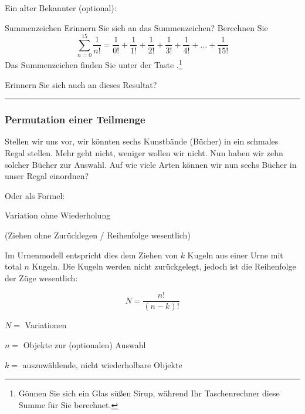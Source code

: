 \newpage
Ein alter Bekannter (optional):

\vspace{3mm}

\begin{bemerkung}{Summenzeichen}{}
Erinnern Sie sich an das Summenzeichen? Berechnen
Sie $$\sum_{n=0}^{15}\frac{1}{n!} = \frac{1}{0!} + \frac{1}{1!}
+ \frac1{2!} + \frac1{3!} + \frac1{4!} + ... + \frac1{15!}$$ Das Summenzeichen finden Sie unter
der Taste .\footnote{Gönnen Sie sich
ein Glas süßen Sirup, während Ihr Taschenrechner diese Summe für Sie berechnet.}
\end{bemerkung}

Erinnern Sie sich auch an dieses Resultat? 

\vspace{1mm}

\hrule


\newpage


\subsubsection{Permutation einer Teilmenge}\label{kombiVariationEinerTeilmenge}
Stellen wir uns vor, wir könnten sechs Kunstbände (Bücher) in ein schmales
Regal stellen. Mehr geht nicht, weniger wollen wir nicht.
Nun haben wir zehn solcher Bücher zur Auswahl. Auf wie viele Arten können wir nun sechs Bücher in unser Regal einordnen?


Oder als Formel:
\begin{gesetz}{Variation ohne Wiederholung}{}

  (Ziehen ohne Zurücklegen / Reihenfolge wesentlich)


Im Urnenmodell entspricht dies dem Ziehen von $k$ Kugeln aus einer
Urne mit total $n$ Kugeln. Die Kugeln werden nicht zurückgelegt,
jedoch ist die Reihenfolge der Züge wesentlich:

$$N =\frac{n!}{(n-k)!}$$

$N = $ Variationen

$n = $ Objekte zur (optionalen) Auswahl

$k = $ auszuwählende, nicht wiederholbare Objekte

\end{gesetz}

